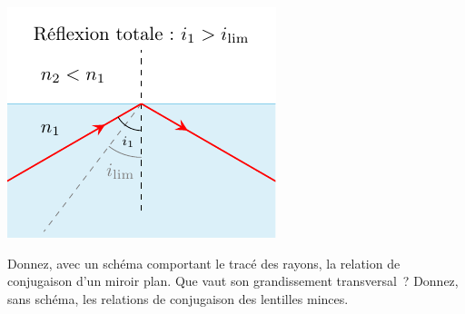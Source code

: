 \documentclass[a4paper, 10pt, final, garamond]{book}
\begin{document}
\begin{enumerate}[label=\sqenumi, leftmargin=10pt]
\begin{isd}[righthand ratio=.3]
\begin{center}
{      }{
			\includegraphics[width=\linewidth]{refl_tot-3}
      }
		\end{center}
	\end{isd}
   Donnez, avec un schéma comportant le tracé des rayons, la relation
  de conjugaison d'un miroir plan. Que vaut son grandissement transversal~?
  Donnez, sans schéma, les relations de conjugaison des lentilles minces.
  \smallbreak
  \begin{isd}[righthand ratio=.2]
    \vspace*{-20pt}
    \tcblower
    \begin{center}
      \switch{
}
\end{center}
\end{isd}
\end{enumerate}
\end{document}
